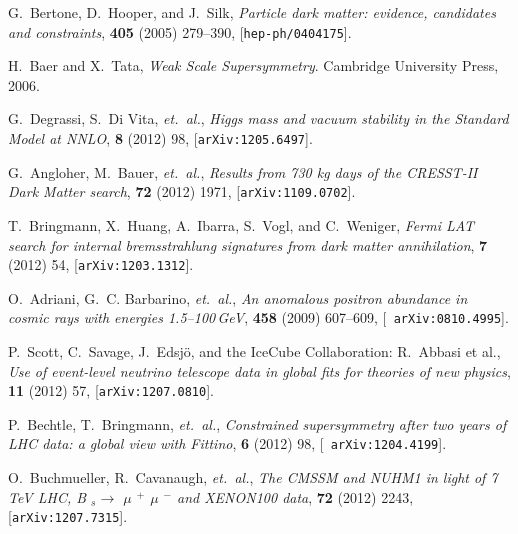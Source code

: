 \documentclass[a4paper,11pt]{article}
\begin{document}
\providecommand{\href}[2]{#2}\begingroup\raggedright\begin{thebibliography}{10}

G.~{Bertone}, D.~{Hooper}, and J.~{Silk}, {\it {Particle dark matter: evidence,
  candidates and constraints}},  {\em \physrep} {\bf 405} (2005) 279--390,
  [\href{http://xxx.lanl.gov/abs/hep-ph/0404175}{{\tt hep-ph/0404175}}].

H.~{Baer} and X.~{Tata}, {\em {Weak Scale Supersymmetry}}.
\newblock Cambridge University Press, 2006.

G.~{Degrassi}, S.~{Di Vita}, {\em et.~al.}, {\it {Higgs mass and vacuum
  stability in the Standard Model at NNLO}},  {\em \jhep} {\bf 8} (2012) 98,
  [\href{http://xxx.lanl.gov/abs/1205.6497}{{\tt arXiv:1205.6497}}].

G.~{Angloher}, M.~{Bauer}, {\em et.~al.}, {\it {Results from 730 kg days of the
  CRESST-II Dark Matter search}},  {\em \epjc} {\bf 72} (2012) 1971,
  [\href{http://xxx.lanl.gov/abs/1109.0702}{{\tt arXiv:1109.0702}}].

T.~{Bringmann}, X.~{Huang}, A.~{Ibarra}, S.~{Vogl}, and C.~{Weniger}, {\it
  {Fermi LAT search for internal bremsstrahlung signatures from dark matter
  annihilation}},  {\em \jcap} {\bf 7} (2012) 54,
  [\href{http://xxx.lanl.gov/abs/1203.1312}{{\tt arXiv:1203.1312}}].

O.~{Adriani}, G.~C. {Barbarino}, {\em et.~al.}, {\it {An anomalous positron
  abundance in cosmic rays with energies 1.5--100\,GeV}},  {\em \nat} {\bf 458}
  (2009) 607--609, [\href{http://xxx.lanl.gov/abs/0810.4995}{{\tt
  arXiv:0810.4995}}].

P.~{Scott}, C.~{Savage}, J.~{Edsj{\"o}}, and {the IceCube Collaboration:
  R.~Abbasi et al.}, {\it {Use of event-level neutrino telescope data in global
  fits for theories of new physics}},  {\em \jcap} {\bf 11} (2012) 57,
  [\href{http://xxx.lanl.gov/abs/1207.0810}{{\tt arXiv:1207.0810}}].

P.~{Bechtle}, T.~{Bringmann}, {\em et.~al.}, {\it {Constrained supersymmetry
  after two years of LHC data: a global view with Fittino}},  {\em \jhep} {\bf
  6} (2012) 98, [\href{http://xxx.lanl.gov/abs/1204.4199}{{\tt
  arXiv:1204.4199}}].

O.~{Buchmueller}, R.~{Cavanaugh}, {\em et.~al.}, {\it {The CMSSM and NUHM1 in
  light of 7 TeV LHC, B $_{ s }${$\to$} {$\mu$} $^{+}$ {$\mu$} $^{-}$ and
  XENON100 data}},  {\em \epjc} {\bf 72} (2012) 2243,
  [\href{http://xxx.lanl.gov/abs/1207.7315}{{\tt arXiv:1207.7315}}].


\end{thebibliography}
\end{document}
